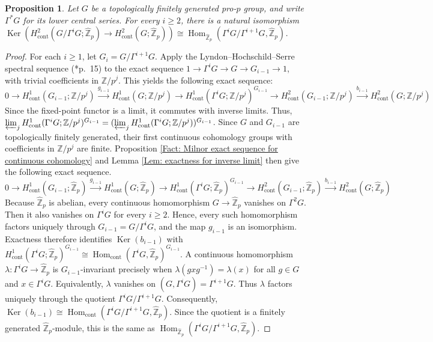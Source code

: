 \documentclass[11pt]{amsart}
\newtheorem{proposition}[theorem]{Proposition}
\theoremstyle{definition}
\numberwithin{equation}{section}
\numberwithin{equation}{section}
\newcommand\ZZ{\mathbb{Z}}
\DeclareMathOperator{\homo}{Hom}
\DeclareMathOperator{\Ker}{Ker}
\DeclareMathOperator{\cont}{cont}
\begin{document}
\begin{proposition}\label{Prop: injectivity of colimit of lower central series into group}
Let $G$ be a topologically finitely generated pro-$p$ group, and write $\Gamma^*G$ for its lower central series. For every $i\geq 2$, there is a natural isomorphism $\Ker(H^2_{\cont}(G/\Gamma^{i}G;\widehat{\ZZ}_p) \rightarrow H^2_{\cont}(G;\widehat{\ZZ}_p))\cong\homo_{\widehat{\ZZ}_p}(\Gamma^{i} G/\Gamma^{i+1} G,\widehat{\ZZ}_p)$. 
\end{proposition} 

\begin{proof}
For each $i\geq 1$,
let $G_i=G/\Gamma^{i+1}G$. Apply the Lyndon–Hochschild–Serre spectral sequence (\cite{Serre-Galois-cohomology}*{p.~15}) to the exact sequence $1\rightarrow \Gamma^i G\rightarrow G\rightarrow G_{i-1}\rightarrow 1$, with trivial coefficients in $\ZZ/p^j$. This yields the following exact sequence:
\[
0\rightarrow H^1_{\cont}(G_{i-1};\ZZ/p^j) \xrightarrow{g_{i-1}} H^1_{\cont}(G;\ZZ/p^j) \rightarrow H^1_{\cont}(\Gamma^i G;\ZZ/p^j)^{G_{i-1}}\rightarrow H^2_{\cont}(G_{i-1};\ZZ/p^j) \xrightarrow{b_{i-1}} H^2_{\cont}(G;\ZZ/p^j)
\]
Since the fixed-point functor is a limit, it commutes with inverse limits. Thus, $\varprojlim_j H^1_{\cont}(\Gamma^i G;\ZZ/p^j)^{G_{i-1}}=(\varprojlim_j H^1_{\cont}(\Gamma^i G;\ZZ/p^j))^{G_{i-1}}$. Since $G$ and $G_{i-1}$ are topologically finitely generated, their first continuous cohomology groups with coefficients in $\ZZ/p^j$ are finite. Proposition \ref{Fact: Milnor exact sequence for continuous cohomology} and Lemma \ref{Lem: exactness for inverse limit} then give the following exact sequence.
\[
0\rightarrow H^1_{\cont}(G_{i-1};\widehat{\ZZ}_p) \xrightarrow{g_{i-1}} H^1_{\cont}(G;\widehat{\ZZ}_p) \rightarrow H^1_{\cont}(\Gamma^i G;\widehat{\ZZ}_p) ^{G_{i-1}}\rightarrow H^2_{\cont}(G_{i-1};\widehat{\ZZ}_p) \xrightarrow{b_{i-1}} H^2_{\cont}(G;\widehat{\ZZ}_p)
\]
Because $\widehat{\ZZ}_p$ is abelian, every continuous homomorphism $G\rightarrow \widehat{\ZZ}_p$ vanishes on $\Gamma^2G$. Then it also vanishes on $\Gamma^i G$ for every $i\geq 2$. Hence, every such homomorphism factors uniquely through $G_{i-1}=G/\Gamma^iG$, and the map $g_{i-1}$ is an isomorphism.
Exactness therefore identifies $\Ker(b_{i-1})$ with $H^1_{\cont}(\Gamma^i G;\widehat{\ZZ}_p)^{G_{i-1}}\cong \homo_{\cont}(\Gamma^i G,\widehat{\ZZ}_p)^{G_{i-1}}$. A continuous homomorphism $\lambda:\Gamma^i G\rightarrow \widehat{\ZZ}_p$ is $G_{i-1}$-invariant precisely when $\lambda(gxg^{-1})=\lambda(x)$ for all $g\in G$ and $x\in \Gamma^{i}G$. Equivalently, $\lambda$ vanishes on  $(G,\Gamma^iG)=\Gamma^{i+1}G$. Thus $\lambda$ factors uniquely through the quotient $\Gamma^iG/\Gamma^{i+1}G$. Consequently, $\Ker(b_{i-1})\cong \homo_{\cont}(\Gamma^i G/\Gamma^{i+1} G,\widehat{\ZZ}_p)$. Since the quotient is a finitely generated $\widehat{\ZZ}_p$-module, this is the same as $\homo_{\widehat{\ZZ}_p}(\Gamma^i G/\Gamma^{i+1} G,\widehat{\ZZ}_p)$.
\end{proof}
\end{document}
